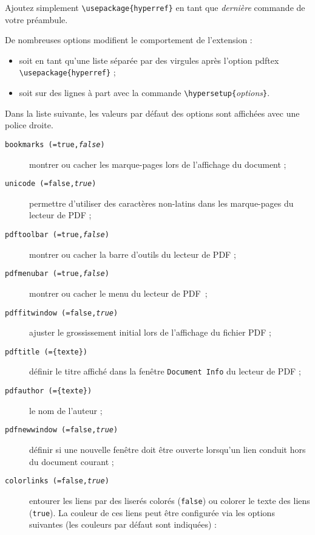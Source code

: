Ajoutez simplement \verb+\usepackage{hyperref}+ en tant que
\emph{dernière} commande de votre préambule.

De nombreuses options modifient le comportement de l'extension
 :
\begin{itemize}
\item soit en tant qu'une liste séparée par des virgules après
  l'option pdftex\\
  \verb+\usepackage{hyperref}+ ;
\item soit sur des lignes à part avec la commande
  \verb+\hypersetup{+\emph{options}\verb+}+.
\end{itemize}

Dans la liste suivante, les valeurs par défaut des options sont
affichées avec une police droite.

\begin{flushleft}
\begin{description}
  \item [\texttt{bookmarks (=true,\textit{false})}] montrer ou cacher
    les marque-pages lors de l'affichage du document ;
  \item [\texttt{unicode (=false,\textit{true})}] permettre d'utiliser
    des caractères non-latins dans les marque-pages du lecteur de PDF ;
  \item [\texttt{pdftoolbar (=true,\textit{false})}] montrer ou cacher
    la barre d'outils du lecteur de PDF ;
  \item [\texttt{pdfmenubar (=true,\textit{false})}] montrer ou cacher
    le menu du lecteur de PDF~;
  \item [\texttt{pdffitwindow (=false,\textit{true})}] ajuster le
    grossissement initial lors de l'affichage du fichier PDF ;
  \item [\texttt{pdftitle (=\{texte\})}] définir le titre affiché dans
    la fenêtre \texttt{Document Info} du lecteur de PDF ;
  \item [\texttt{pdfauthor (=\{texte\})}] le nom de l'auteur ;
  \item [\texttt{pdfnewwindow (=false,\textit{true})}] définir si une
    nouvelle fenêtre doit être ouverte lorsqu'un lien conduit hors du
    document courant ;
  \item [\texttt{colorlinks (=false,\textit{true})}] entourer les
    liens par des liserés colorés (\texttt{false}) ou colorer le texte
    des liens (\texttt{true}). La couleur de ces liens peut
    être configurée via les options suivantes (les couleurs par défaut
    sont indiquées) :
    \begin{description}

\end{description}
\end{description}
\end{flushleft}
